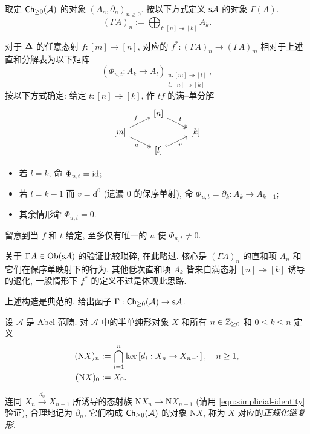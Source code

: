 \begin{definition}\label{def:DK-Gamma}
	取定 $\mathsf{Ch}_{\geq 0}(\mathcal{A})$ 的对象 $(A_n, \partial_n)_{n \geq 0}$. 按以下方式定义 $\mathsf{s}\mathcal{A}$ 的对象 $\Gamma(A)$.
	\[ (\Gamma A)_n := \bigoplus_{t: [n] \twoheadrightarrow [k]} A_k. \]
	
	对于 $\bm\Delta$ 的任意态射 $f: [m] \to [n]$, 对应的 $f^*: (\Gamma A)_n \to (\Gamma A)_m$ 相对于上述直和分解表为以下矩阵 
	\[ \left( \Phi_{u, t} : A_k \to A_l \right)_{\substack{ u: [m] \twoheadrightarrow [l] \\ t: [n] \twoheadrightarrow [k] }}, \]
	按以下方式确定: 给定 $t: [n] \twoheadrightarrow [k]$, 作 $tf$ 的满--单分解
	\begin{equation}\label{eqn:Dold-Kan-epi-mono}\begin{tikzcd}[row sep=tiny]
		& {[n]} \arrow[twoheadrightarrow, rd, "t"] & \\
		{[m]} \arrow[ru, "f"] \arrow[twoheadrightarrow, rd, "u"'] & & {[k]} \\
		& {[l]} \arrow[hookrightarrow, ru, "v"'] &
	\end{tikzcd}\end{equation}
	\begin{itemize}
		\item 若 $l = k$, 命 $\Phi_{u, t} = \mathrm{id}$;
		\item 若 $l = k-1$ 而 $v = \mathrm{d}^0$ (遗漏 $0$ 的保序单射), 命 $\Phi_{u, t} = \partial_k: A_k \to A_{k-1}$;
		\item 其余情形命 $\Phi_{u, t} = 0$.
	\end{itemize}
	留意到当 $f$ 和 $t$ 给定, 至多仅有唯一的 $u$ 使 $\Phi_{u, t} \neq 0$.
\end{definition}

关于 $\Gamma A \in \operatorname{Ob}(\mathsf{s}\mathcal{A})$ 的验证比较琐碎, 在此略过. 核心是 $(\Gamma A)_n$ 的直和项 $A_n$ 和它们在保序单映射下的行为, 其他低次直和项 $A_k$ 皆来自满态射 $[n] \twoheadrightarrow [k]$ 诱导的退化, 一般情形下 $f^*$ 的定义不过是体现此思路.

上述构造是典范的, 给出函子 $\Gamma: \mathsf{Ch}_{\geq 0}(\mathcal{A}) \to \mathsf{s}\mathcal{A}$.

\begin{definition}\label{def:normalized-cplx}
	设 $\mathcal{A}$ 是 Abel 范畴. 对 $\mathcal{A}$ 中的半单纯形对象 $X$ 和所有 $n \in \mathbb{Z}_{\geq 0}$ 和 $0 \leq k \leq n$ 定义
	\begin{align*}
		(\mathrm{N} X)_n & := \bigcap_{i=1}^n \operatorname{ker}\left[ d_i: X_n \to X_{n-1} \right], \quad n \geq 1, \\
		(\mathrm{N} X)_0 & := X_0.
	\end{align*}

	连同 $X_n \xrightarrow{d_0} X_{n-1}$ 所诱导的态射族 $\mathrm{N}X_n \to \mathrm{N}X_{n-1}$ (请用 \eqref{eqn:simplicial-identity} 验证), 合理地记为 $\partial_n$, 它们构成 $\mathsf{Ch}_{\geq 0}(\mathcal{A})$ 的对象 $\mathrm{N}X$, 称为 $X$ 对应的\emph{正规化链复形}.
\end{definition}

